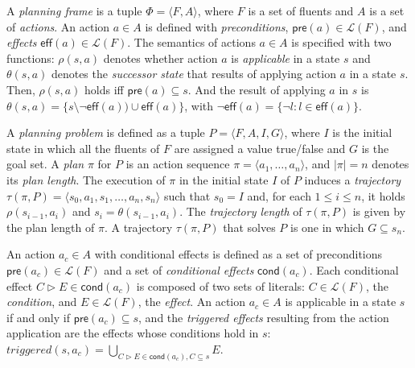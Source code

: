 \documentclass[letterpaper]{article} %
\newcommand{\tup}[1]{{\langle #1 \rangle}}
\newcommand{\pre}{\mathsf{pre}}     %
\newcommand{\eff}{\mathsf{eff}}     %
\newcommand{\cond}{\mathsf{cond}}   %
\begin{document}
A {\em planning frame} is a tuple $\Phi=\tup{F,A}$, where $F$ is a set of fluents and $A$ is a set of \emph{actions}. An action $a\in A$ is defined with {\em preconditions}, $\pre(a)\in\mathcal{L}(F)$,  and {\em effects} $\eff(a)\in\mathcal{L}(F)$. The semantics of actions $a\in A$ is specified with two functions: $\rho(s,a)$ denotes whether action $a$ is {\em applicable} in a state $s$ and $\theta(s,a)$ denotes the {\em successor state} that results of applying action $a$ in a state $s$. Then, $\rho(s,a)$ holds iff $\pre(a)\subseteq s$. And the result of applying $a$ in $s$ is $\theta(s,a)=\{s\setminus\neg\eff(a))\cup\eff(a)\}$, with $\neg\eff(a) = \{\neg l : l \in \eff(a)\}$.

A {\em planning problem} is defined as a tuple $P=\tup{F,A,I,G}$, where $I$ is the initial state in which all the fluents of $F$ are assigned a value true/false and $G$ is the goal set. A {\em plan} $\pi$ for $P$ is an action sequence $\pi=\tup{a_1, \ldots, a_n}$, and $|\pi|=n$ denotes its {\em plan length}. The execution of $\pi$ in the initial state $I$ of $P$ induces a {\em trajectory} $\tau(\pi,P)=\tup{s_0, a_1, s_1, \ldots, a_n, s_n}$ such that $s_0=I$ and, for each {\small $1\leq i\leq n$}, it holds $\rho(s_{i-1},a_i)$ and $s_i=\theta(s_{i-1},a_i)$. The {\em trajectory length} of $\tau(\pi,P)$ is given by the plan length of $\pi$. A trajectory $\tau(\pi,P)$ that solves $P$ is one in which $G \subseteq s_n$.

%

An action $a_c\in A$ with conditional effects is defined as a set of preconditions $\pre(a_c)\in\mathcal{L}(F)$ and a set of {\em conditional effects} $\cond(a_c)$. Each conditional effect $C\rhd E\in\cond(a_c)$ is composed of two sets of literals: $C\in\mathcal{L}(F)$, the {\em condition}, and $E\in\mathcal{L}(F)$, the {\em effect}. An action $a_c\in A$ is applicable in a state $s$ if and only if $\pre(a_c)\subseteq s$, and the {\em triggered effects} resulting from the action application are the effects whose conditions hold in $s$: $triggered(s,a_c)=\bigcup_{C\rhd E\in\cond(a_c),C\subseteq s} E$.
\end{document}
